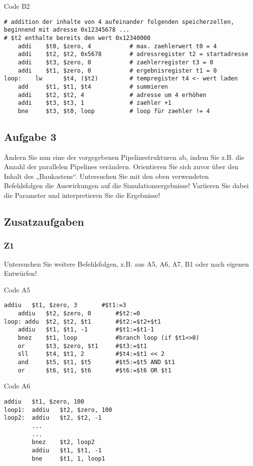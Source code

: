 \documentclass[a4paper,12pt,titlepage]{scrartcl}
\begin{document}
Code B2
\begin{lstlisting}[basicstyle=\tiny]
# addition der inhalte von 4 aufeinander folgenden speicherzellen, beginnend mit adresse 0x12345678 ...
# $t2 enthalte bereits den wert 0x12340000
    addi    $t0, $zero, 4           # max. zaehlerwert t0 = 4
    addi    $t2, $t2, 0x5678        # adressregister t2 = startadresse
    addi    $t3, $zero, 0           # zaehlerregister t3 = 0
    addi    $t1, $zero, 0           # ergebnisregister t1 = 0
loop:    lw      $t4, ($t2)         # tempregister t4 <- wert laden
    add     $t1, $t1, $t4           # summieren
    addi    $t2, $t2, 4             # adresse um 4 erhöhen
    addi    $t3, $t3, 1             # zaehler +1
    bne     $t3, $t0, loop          # loop für zaehler != 4
\end{lstlisting}

\subsection*{Aufgabe 3}
Ändern Sie nun eine der vorgegebenen Pipelinestrukturen ab, indem Sie z.B. die Anzahl der parallelen Pipelines verändern. Orientieren Sie sich zuvor über den Inhalt des „Baukastens“. Untersuchen Sie mit den oben verwendeten Befehlsfolgen die Auswirkungen auf die Simulationsergebnisse! Variieren Sie dabei die Parameter und interpretieren Sie die Ergebnisse!

\subsection*{Zusatzaufgaben}
\subsubsection*{Z1}
Untersuchen Sie weitere Befehlsfolgen, z.B. aus A5, A6, A7, B1 oder nach eigenen Entwürfen!

Code A5
\begin{lstlisting}[basicstyle=\tiny]
    addiu   $t1, $zero, 3       #$t1:=3
    addiu   $t2, $zero, 0       #$t2:=0
loop: addu  $t2, $t2, $t1       #$t2:=$t2+$t1
    addiu   $t1, $t1, -1        #$t1:=$t1-1
    bnez    $t1, loop           #branch loop (if $t1<>0)
    or      $t3, $zero, $t1     #$t3:=$t1
    sll     $t4, $t1, 2         #$t4:=$t1 << 2
    and     $t5, $t1, $t5       #$t5:=$t5 AND $t1
    or      $t6, $t1, $t6       #$t6:=$t6 OR $t1
\end{lstlisting}

Code A6
\begin{lstlisting}[basicstyle=\tiny]
        addiu   $t1, $zero, 100
loop1:  addiu   $t2, $zero, 100
loop2:  addiu   $t2, $t2, -1
        ...
        ...
        bnez    $t2, loop2
        addiu   $t1, $t1, -1
        bne     $t1, 1, loop1
\end{lstlisting}
\end{document}
